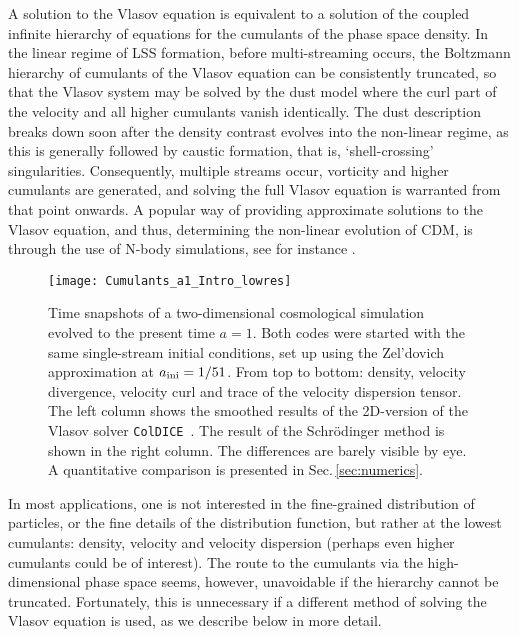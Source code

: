 \documentclass[twocolumn, nofootinbib, showpacs, superscriptaddress]{revtex4-1}
\begin{document}
A solution to the Vlasov equation is equivalent to a solution of the coupled infinite hierarchy of equations 
for the cumulants of the phase space density.  In the linear regime of LSS formation, before multi-streaming occurs, 
the Boltzmann hierarchy of cumulants of the Vlasov equation can be consistently truncated, so that
the Vlasov system may be solved by the dust model \cite{P80} where the curl part of the 
velocity and all higher cumulants vanish identically.
The dust description breaks down soon after the density contrast evolves into the non-linear regime, 
as this is generally followed by caustic formation, that is, `shell-crossing' singularities. Consequently,
  multiple streams occur, vorticity and higher cumulants are generated, 
and solving the full Vlasov equation is warranted from that point onwards.
A popular way of providing approximate solutions to the Vlasov equation, and thus,
 determining the non-linear evolution of CDM, is through the use of N-body simulations, 
see for instance \cite{T02,SWF05,SWF06,SW09,AHK12,HAK13}. 


%
\begin{figure}[t!]
\texttt{[image: Cumulants\_a1\_Intro\_lowres]}\\
\caption{Time snapshots of a two-dimensional cosmological simulation evolved to the present time $a=1$.
 Both codes were started with the same single-stream initial conditions, set up using the Zel'dovich approximation at $a_{\rm ini}=1/51$.
From top to bottom: density, velocity divergence, velocity curl and trace of the velocity dispersion tensor. 
The left column shows the smoothed results of the 2D-version of the Vlasov solver \texttt{ColDICE}~\cite{SousbieColombi2016}.
The result of the Schr\"odinger method is shown in the right column.
 The differences are barely visible by eye. A quantitative comparison is presented in Sec.\,\ref{sec:numerics}.}
\label{fig:ScMteaser}
\end{figure}
  
In most applications, one is not interested in the fine-grained distribution of particles, or the fine details of the distribution function,
but rather at the lowest cumulants: density, velocity and velocity dispersion (perhaps even higher cumulants could be of interest).
The route to the cumulants via the high-dimensional phase space seems, however, unavoidable if the hierarchy cannot be truncated. 
Fortunately, this is unnecessary if a different method of solving the Vlasov equation is used, as we describe below in more detail.
\end{document}
